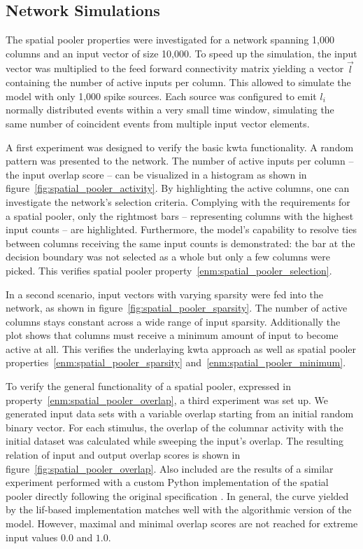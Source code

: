 \subsection{Network Simulations}


The spatial pooler properties were investigated for a network spanning 1,000 columns and an input vector of size 10,000. To speed up the simulation, the input vector was multiplied to the feed forward connectivity matrix yielding a vector $\vec{l}$ containing the number of active inputs per column. This allowed to simulate the model with only 1,000 spike sources. Each source was configured to emit $l_i$ normally distributed events within a very small time window, simulating the same number of coincident events from multiple input vector elements.

A first experiment was designed to verify the basic \gls{kwta} functionality. A random pattern was presented to the network. The number of active inputs per column -- the input overlap score -- can be visualized in a histogram as shown in figure~\ref{fig:spatial_pooler_activity}. By highlighting the active columns, one can investigate the network's selection criteria. Complying with the requirements for a spatial pooler, only the rightmost bars -- representing columns with the highest input counts -- are highlighted. Furthermore, the model's capability to resolve ties between columns receiving the same input counts is demonstrated: the bar at the decision boundary was not selected as a whole but only a few columns were picked. This verifies spatial pooler property~\ref{enm:spatial_pooler_selection}.

In a second scenario, input vectors with varying sparsity were fed into the network, as shown in figure~\ref{fig:spatial_pooler_sparsity}. The number of active columns stays constant across a wide range of input sparsity. Additionally the plot shows that columns must receive a minimum amount of input to become active at all. This verifies the underlaying \gls{kwta} approach as well as spatial pooler properties~\ref{enm:spatial_pooler_sparsity} and~\ref{enm:spatial_pooler_minimum}.

To verify the general functionality of a spatial pooler, expressed in property~\ref{enm:spatial_pooler_overlap}, a third experiment was set up. We generated input data sets with a variable overlap starting from an initial random binary vector. For each stimulus, the overlap of the columnar activity with the initial dataset was calculated while sweeping the input's overlap. The resulting relation of input and output overlap scores is shown in figure~\ref{fig:spatial_pooler_overlap}. Also included are the results of a similar experiment performed with a custom Python implementation of the spatial pooler directly following the original specification \citep{numenta2011htm}. In general, the curve yielded by the \gls{lif}-based implementation matches well with the algorithmic version of the model. However, maximal and minimal overlap scores are not reached for extreme input values $0.0$ and $1.0$.

